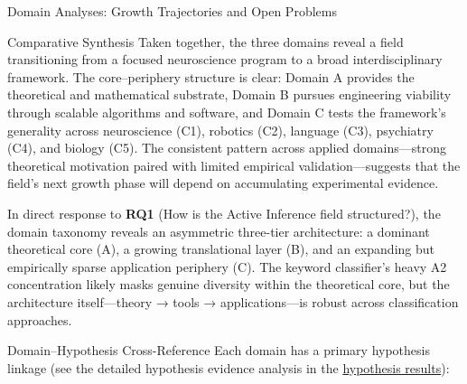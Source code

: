 \documentclass[
  ignorenonframetext,
]{beamer}
\begin{document}
\begin{frame}{Domain Analyses: Growth Trajectories and Open Problems
\label{sec:subfield_analyses}}
\begin{block}{Comparative Synthesis}
\protect{}\label{comparative-synthesis}
Taken together, the three domains reveal a field transitioning from a
focused neuroscience program to a broad interdisciplinary framework. The
core--periphery structure is clear: Domain A provides the theoretical
and mathematical substrate, Domain B pursues engineering viability
through scalable algorithms and software, and Domain C tests the
framework's generality across neuroscience (C1), robotics (C2), language
(C3), psychiatry (C4), and biology (C5). The consistent pattern across
applied domains---strong theoretical motivation paired with limited
empirical validation---suggests that the field's next growth phase will
depend on accumulating experimental evidence.

In direct response to \textbf{RQ1} (How is the Active Inference field
structured?), the domain taxonomy reveals an asymmetric three-tier
architecture: a dominant theoretical core (A), a growing translational
layer (B), and an expanding but empirically sparse application periphery
(C). The keyword classifier's heavy A2 concentration likely masks
genuine diversity within the theoretical core, but the architecture
itself---theory → tools → applications---is robust across classification
approaches.

\begin{block}{Domain--Hypothesis Cross-Reference}
\protect{}\label{domainhypothesis-cross-reference}
Each domain has a primary hypothesis linkage (see the detailed
hypothesis evidence analysis in the
\hyperref[sec:hypothesis_results]{hypothesis results}):


\end{block}
\end{block}
\end{frame}
\end{document}
